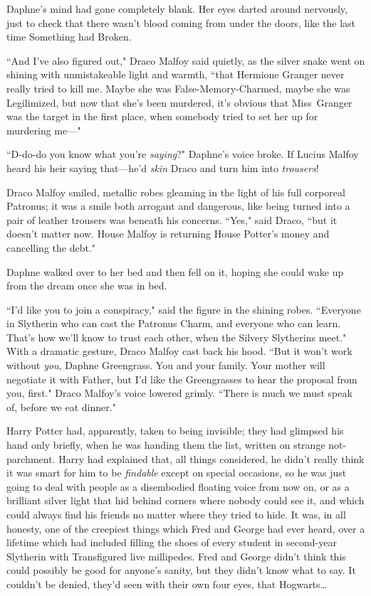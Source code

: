 Daphne's mind had gone completely blank. Her eyes darted around nervously, just to check that there wasn't blood coming from under the doors, like the last time Something had Broken.

``And I've also figured out," Draco Malfoy said quietly, as the silver snake went on shining with unmistakeable light and warmth, ``that Hermione Granger never really tried to kill me. Maybe she was False-Memory-Charmed, maybe she was Legilimized, but now that she's been murdered, it's obvious that Miss~Granger was the target in the first place, when somebody tried to set her up for murdering me—"

``D-do-do you know what you're \emph{saying}?" Daphne's voice broke. If Lucius Malfoy heard his heir saying that—he'd \emph{skin} Draco and turn him into \emph{trousers}!

Draco Malfoy smiled, metallic robes gleaming in the light of his full corporeal Patronus; it was a smile both arrogant and dangerous, like being turned into a pair of leather trousers was beneath his concerns. ``Yes," said Draco, ``but it doesn't matter now. House Malfoy is returning House Potter's money and cancelling the debt."

Daphne walked over to her bed and then fell on it, hoping she could wake up from the dream once she was in bed.

``I'd like you to join a conspiracy," said the figure in the shining robes. ``Everyone in Slytherin who can cast the Patronus Charm, and everyone who can learn. That's how we'll know to trust each other, when the Silvery Slytherins meet." With a dramatic gesture, Draco Malfoy cast back his hood. ``But it won't work without \emph{you}, Daphne Greengrass. You and your family. Your mother will negotiate it with Father, but I'd like the Greengrasses to hear the proposal from you, first." Draco Malfoy's voice lowered grimly. ``There is much we must speak of, before we eat dinner."

\later

Harry Potter had, apparently, taken to being invisible; they had glimpsed his hand only briefly, when he was handing them the list, written on strange not-parchment. Harry had explained that, all things considered, he didn't really think it was smart for him to be \emph{findable} except on special occasions, so he was just going to deal with people as a disembodied floating voice from now on, or as a brilliant silver light that hid behind corners where nobody could see it, and which could always find his friends no matter where they tried to hide. It was, in all honesty, one of the creepiest things which Fred and George had ever heard, over a lifetime which had included filling the shoes of every student in second-year Slytherin with Transfigured live millipedes. Fred and George didn't think this could possibly be good for anyone's sanity, but they didn't know what to say. It couldn't be denied, they'd seen with their own four eyes, that Hogwarts{\ldots}

